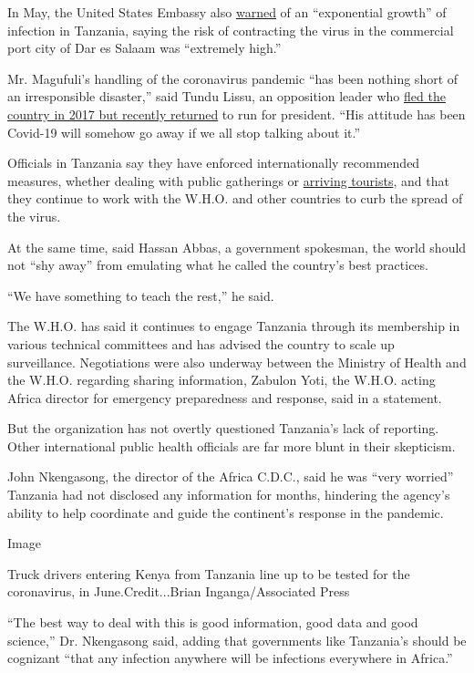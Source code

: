 In May, the United States Embassy also
\href{https://tz.usembassy.gov/health-alert-u-s-embassy-dar-es-salaam-may-13-2020/}{warned}
of an ``exponential growth'' of infection in Tanzania, saying the risk
of contracting the virus in the commercial port city of Dar es Salaam
was ``extremely high.''

Mr. Magufuli's handling of the coronavirus pandemic ``has been nothing
short of an irresponsible disaster,'' said Tundu Lissu, an opposition
leader who
\href{https://www.nytimes3xbfgragh.onion/aponline/2020/07/27/world/africa/ap-af-tanzania-opposition-leader-returns.html}{fled
the country in 2017 but recently returned} to run for president. ``His
attitude has been Covid-19 will somehow go away if we all stop talking
about it.''

Officials in Tanzania say they have enforced internationally recommended
measures, whether dealing with public gatherings or
\href{https://twitter.com/MsigwaGerson/status/1279145467297894403}{arriving
tourists}, and that they continue to work with the W.H.O. and other
countries to curb the spread of the virus.

At the same time, said Hassan Abbas, a government spokesman, the world
should not ``shy away'' from emulating what he called the country's best
practices.

``We have something to teach the rest,'' he said.

The W.H.O. has said it continues to engage Tanzania through its
membership in various technical committees and has advised the country
to scale up surveillance. Negotiations were also underway between the
Ministry of Health and the W.H.O. regarding sharing information, Zabulon
Yoti, the W.H.O. acting Africa director for emergency preparedness and
response, said in a statement.

But the organization has not overtly questioned Tanzania's lack of
reporting. Other international public health officials are far more
blunt in their skepticism.

John Nkengasong, the director of the Africa C.D.C., said he was ``very
worried'' Tanzania had not disclosed any information for months,
hindering the agency's ability to help coordinate and guide the
continent's response in the pandemic.

Image

Truck drivers entering Kenya from Tanzania line up to be tested for the
coronavirus, in June.Credit...Brian Inganga/Associated Press

``The best way to deal with this is good information, good data and good
science,'' Dr. Nkengasong said, adding that governments like Tanzania's
should be cognizant ``that any infection anywhere will be infections
everywhere in Africa.''

